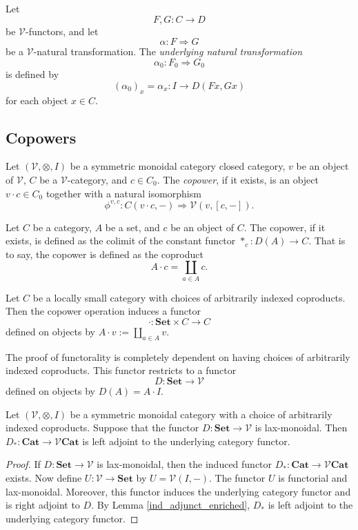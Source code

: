\documentclass{tac}
\begin{document}
\begin{definition}
Let
\[
F,G:C\to D
\]
be $\mathcal V$-functors, and let
\[
\alpha:F\Rightarrow G
\]
be a $\mathcal V$-natural transformation. The \emph{underlying natural transformation}
\[
\alpha_0:F_0\Rightarrow G_0
\]
is defined by
\[
(\alpha_0)_x=\alpha_x:I\to D(Fx,Gx)
\]
for each object $x\in C$.
\end{definition}


\subsection*{Copowers}
\begin{definition}
Let $(\mathcal V,\otimes,I)$ be a symmetric monoidal category closed category, $v$ be an object of $\mathcal{V}$, $C$ be a $\mathcal{V}$-category, and $c\in C_0$. The \emph{copower}, if it exists, is an object $v\cdot c\in C_0$ together with a natural isomorphism 
\[
\phi^{v,c}:C(v\cdot c,-)\Rightarrow \mathcal{V}(v,[c,-]).
\]
\end{definition}

\begin{example}
Let $C$ be a category, $A$ be a set, and $c$ be an object of $C$. The copower, if it exists, is defined as the colimit of the constant functor $*_c:D(A)\to C$. That is to say, the copower is defined as the coproduct
\[
A\cdot c=\coprod_{a\in A}c.
\]
\end{example}

\begin{lemma}\label{copower_functor}
Let $C$ be a locally small category with choices of arbitrarily indexed coproducts. Then the copower operation induces a functor
\[
\cdot:\mathbf{Set}\times C\to C
\]
defined on objects by $A\cdot v:=\coprod_{a\in A}v$.
\end{lemma}
The proof of functorality is completely dependent on having choices of arbitrarily indexed coproducts. This functor restricts to a functor 
\[
D:\mathbf{Set}\to \mathcal{V}
\]
defined on objects by $D(A)=A\cdot I$.

\begin{proposition} \label{copies_functor}
Let $(\mathcal{V},\otimes, I)$ be a symmetric monoidal category with a choice of arbitrarily indexed coproducts. Suppose that the functor $D:\mathbf{Set}\to\mathcal{V}$ is lax-monoidal. Then $D_*:\mathbf{Cat}\to\mathcal{V}\mathbf{Cat}$ is left adjoint to the underlying category functor. 
\end{proposition}

\begin{proof}
  If $D:\mathbf{Set}\to\mathcal{V}$ is lax-monoidal, then the induced functor $D_*:\mathbf{Cat}\to\mathcal{V}\mathbf{Cat}$ exists. Now define $U:\mathcal{V}\to\mathbf{Set}$ by $U=\mathcal{V}(I,-)$. The functor $U$ is functorial and lax-monoidal. Moreover, this functor induces the underlying category functor and is right adjoint to $D$. By Lemma \ref{ind_adjunct_enriched}, $D_*$ is left adjoint to the underlying category functor.
\end{proof}
\end{document}
